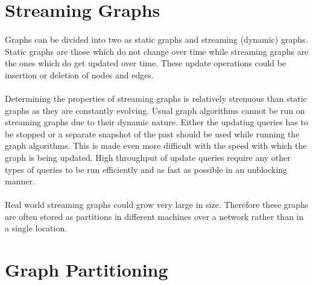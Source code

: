 \section{Streaming Graphs}

\paragraph{}
Graphs can be divided into two as static graphs and streaming (dynamic) graphs. Static graphs are those which do not  change over time while streaming graphs are the ones which do get updated over time. These update operations could be insertion or deletion of nodes and edges. 

\paragraph{}
Determining the properties of streaming graphs is relatively strenuous than static graphs as they are constantly evolving. Usual graph algorithms cannot be run on streaming graphs due to their dynamic nature. Either the updating queries has to be stopped or a separate snapshot of the past should be used while running the graph algorithms. This is made even more difficult with the speed with which the graph is being updated. High throughput of update queries require any other types of queries to be run efficiently and as fast as possible in an unblocking manner. 

\paragraph{}
Real world streaming graphs could grow very large in size. Therefore these graphs are often stored as partitions in different machines over a network rather than in a single location. 

\section{Graph Partitioning}

